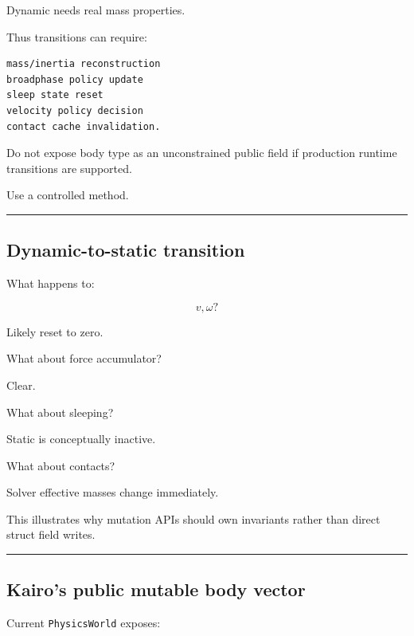 Dynamic needs real mass properties.

Thus transitions can require:

\begin{verbatim}
mass/inertia reconstruction
broadphase policy update
sleep state reset
velocity policy decision
contact cache invalidation.
\end{verbatim}

Do not expose body type as an unconstrained public field if production runtime transitions are supported.

Use a controlled method.

\begin{center}\rule{0.5\linewidth}{0.5pt}\end{center}

\subsection{Dynamic-to-static transition}\label{06-engine-ii-ch038-dynamic-to-static-transition}

\hypertarget{06-engine-ii-ch038-dynamic-to-static-transition}{}

What happens to:

\[
v,\omega?
\]

Likely reset to zero.

What about force accumulator?

Clear.

What about sleeping?

Static is conceptually inactive.

What about contacts?

Solver effective masses change immediately.

This illustrates why mutation APIs should own invariants rather than direct struct field writes.

\begin{center}\rule{0.5\linewidth}{0.5pt}\end{center}

\subsection{Kairo's public mutable body vector}\label{06-engine-ii-ch038-kairos-public-mutable-body-vector}

\hypertarget{06-engine-ii-ch038-kairos-public-mutable-body-vector}{}

Current \texttt{PhysicsWorld} exposes:

